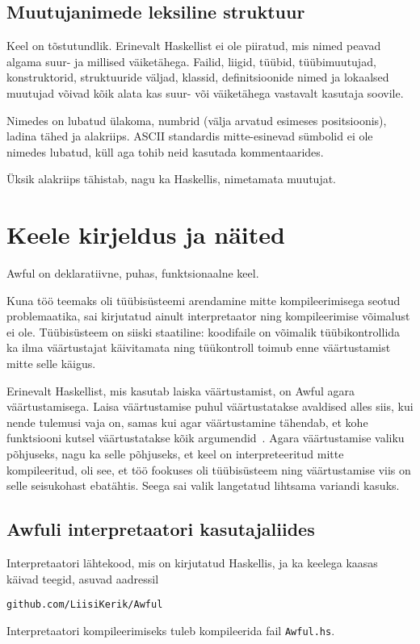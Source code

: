 \documentclass[12pt]{article}
\newcommand\peatykk[1]{
  \clearpage
  \section{#1}}
\begin{document}
    \subsection{Muutujanimede leksiline struktuur}\label{muutujanimed}
      Keel on tõstutundlik. Erinevalt Haskellist ei ole piiratud, mis nimed peavad algama suur- ja millised väiketähega. Failid, liigid, tüübid, tüübimuutujad, konstruktorid, struktuuride väljad, klassid, definitsioonide nimed ja lokaalsed muutujad võivad kõik alata kas suur- või väiketähega vastavalt kasutaja soovile.

      Nimedes on lubatud ülakoma, numbrid (välja arvatud esimeses positsioonis), ladina tähed ja alakriips. ASCII standardis mitte-esinevad sümbolid ei ole nimedes lubatud, küll aga tohib neid kasutada kommentaarides.

      Üksik alakriips tähistab, nagu ka Haskellis, nimetamata muutujat.
  \peatykk{Keele kirjeldus ja näited}\label{manual}
    Awful on deklaratiivne, puhas, funktsionaalne keel.

    Kuna töö teemaks oli tüübisüsteemi arendamine mitte kompileerimisega seotud problemaatika, sai kirjutatud ainult interpretaator ning kompileerimise võimalust ei ole. Tüübisüsteem on siiski staatiline: koodifaile on võimalik tüübikontrollida ka ilma väärtustajat käivitamata ning tüükontroll toimub enne väärtustamist mitte selle käigus.

    Erinevalt Haskellist, mis kasutab laiska väärtustamist, on Awful agara väärtustamisega. Laisa väärtustamise puhul väärtustatakse avaldised alles siis, kui nende tulemusi vaja on, samas kui agar väärtustamine tähendab, et kohe funktsiooni kutsel väärtustatakse kõik argumendid~\cite{Sem}. Agara väärtustamise valiku põhjuseks, nagu ka selle põhjuseks, et keel on interpreteeritud mitte kompileeritud, oli see, et töö fookuses oli tüübisüsteem ning väärtustamise viis on selle seisukohast ebatähtis. Seega sai valik langetatud lihtsama variandi kasuks.
    \subsection{Awfuli interpretaatori kasutajaliides}
      Interpretaatori lähtekood, mis on kirjutatud Haskellis, ja ka keelega kaasas käivad teegid, asuvad aadressil

      \begin{verbatim}github.com/LiisiKerik/Awful\end{verbatim}

      Interpretaatori kompileerimiseks tuleb kompileerida fail \verb!Awful.hs!.
\end{document}
